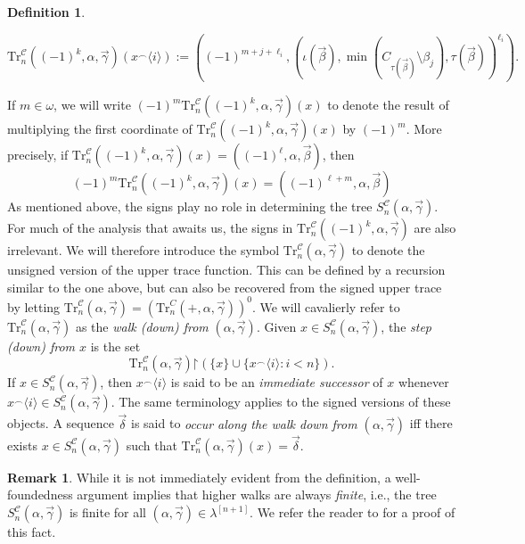 \documentclass{amsart}
\numberwithin{theorem}{section}
\theoremstyle{definition}
\newtheorem{definition}[theorem]{Definition}
\newtheorem{remark}[theorem]{Remark}
\newcommand{\seq}[1]{{\langle{#1}\rangle}}
\newcommand{\restr}{\mathord{\upharpoonright}}
\newcommand{\mc}{\mathcal}
\newcommand{\w}{\omega}
\newcommand{\C}{\mathcal{C}}
\newcommand{\Tr}{\mathrm{Tr}}
\begin{document}
\begin{definition}
\begin{itemize}
\begin{itemize}
\[
\Tr^{\C}_n((-1)^k,\alpha,\vec\gamma)(x^\smallfrown\seq{i}):=((-1)^{m+j+\ell_i},(\iota(\vec\beta),\min(C_{\tau(\vec\beta)}\setminus\beta_j),\tau(\vec\beta))^{\ell_i}).
\]
\end{itemize}
\end{itemize}
If $m\in\w$, we will write $(-1)^m\Tr_n^\C((-1)^k,\alpha,\vec\gamma)(x)$ to denote the result of multiplying the first coordinate of $\Tr_n^\C((-1)^k,\alpha,\vec\gamma)(x)$ by $(-1)^m$. More precisely, if $\Tr_n^\C((-1)^k,\alpha,\vec\gamma)(x)=((-1)^\ell,\alpha,\vec\beta)$, then 
\[
(-1)^m\Tr_n^\C((-1)^k,\alpha,\vec\gamma)(x)=((-1)^{\ell+m},\alpha,\vec\beta)
\]
As mentioned above, the signs play no role in determining the tree $S^{\C}_n(\alpha,\vec\gamma)$. For much of the analysis that awaits us, the signs in $\Tr^{\C}_n((-1)^k,\alpha,\vec\gamma)$ are also irrelevant. We will therefore introduce 
the symbol $\Tr^{\C}_n(\alpha,\vec\gamma)$ to denote the unsigned version of the upper trace function. This can be defined by a recursion similar to the one above, but can also be recovered from the signed upper trace by letting $\Tr^{\C}_n(\alpha,\vec\gamma)=(\Tr^{C}_n(+,\alpha,\vec\gamma))^0$. We will cavalierly refer to $\Tr^{\C}_n(\alpha,\vec\gamma)$ as the \emph{walk (down) from} $(\alpha,\vec\gamma)$. Given $x\in S^{\C}_n(\alpha,\vec\gamma)$, the \emph{step (down) from $x$} is the set
\[
\Tr^{\C}_n(\alpha,\vec\gamma)\restr\left(\{x\}\cup \{x^\smallfrown\seq{i}:i<n\}\right).
\]
If $x\in S^{\C}_n(\alpha,\vec\gamma)$, then $x^\smallfrown\seq{i}$ is said to be an \emph{immediate successor} of $x$ whenever $x^\smallfrown\seq{i}\in S^{\C}_n(\alpha,\vec\gamma)$. The same terminology applies to the signed versions of these objects. A sequence $\vec{\delta}$ is said to \emph{occur along the walk down from $(\alpha,\vec\gamma)$} iff there exists $x\in S^{\C}_n(\alpha,\vec\gamma)$ such that $\Tr^{\C}_n(\alpha,\vec\gamma)(x)=\vec\delta$.

\begin{remark}
  While it is not immediately evident from the definition, a well-foundedness argument 
  implies that higher walks are always \emph{finite}, i.e., the tree 
  $S_n^{\mc{C}}(\alpha,\vec{\gamma})$ is finite for all $(\alpha,\vec{\gamma}) \in \lambda^{[n+1]}$. 
  We refer the reader to \cite[Theorem 5.4]{bergfalk2024introductionhigherwalks} for a proof of 
  this fact.
\end{remark}


\end{definition}
\end{document}
